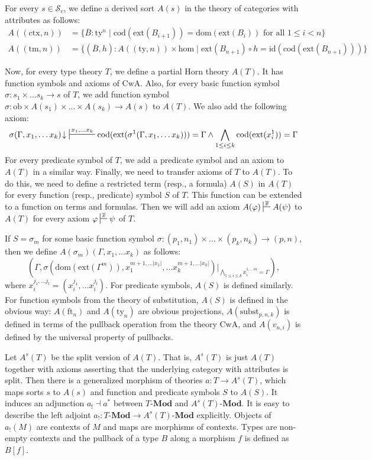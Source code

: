 \documentclass[reqno]{amsart}
\theoremstyle{definition}
\theoremstyle{remark}
\newcommand{\fs}[1]{\mathrm{#1}}
\newcommand{\Mod}[1]{#1\text{-}\mathbf{Mod}}
\numberwithin{figure}{section}
\begin{document}
For every $s \in \mathcal{S}_c$, we define a derived sort $A(s)$ in the theory of categories with attributes as follows:
\begin{align*}
A((\fs{ctx},n)) & = \{ \overline{B} : \fs{ty}^n \mid \fs{cod}(\fs{ext}(B_{i+1})) = \fs{dom}(\fs{ext}(B_i)) \text{ for all } 1 \leq i < n \} \\
A((\fs{tm},n)) & = \{ (\overline{B}, h) : A((\fs{ty},n)) \times \fs{hom} \mid \fs{ext}(B_{n+1}) \circ h = \fs{id}(\fs{cod}(\fs{ext}(B_{n+1}))) \}
\end{align*}

Now, for every type theory $T$, we define a partial Horn theory $A(T)$.
It has function symbols and axioms of $\fs{CwA}$.
Also, for every basic function symbol $\sigma : s_1 \times \ldots s_k \to s$ of $T$, we add function symbol $\sigma : \fs{ob} \times A(s_1) \times \ldots \times A(s_k) \to A(s)$ to $A(T)$.
We also add the following axiom:
\[ \sigma(\Gamma, x_1, \ldots x_k)\!\downarrow\ \sststile{}{x_1, \ldots x_k} \fs{cod}(\fs{ext}(\sigma^1(\Gamma, x_1, \ldots x_k))) = \Gamma \land \bigwedge_{1 \leq i \leq k} \fs{cod}(\fs{ext}(x_i^1)) = \Gamma \]
For every predicate symbol of $T$, we add a predicate symbol and an axiom to $A(T)$ in a similar way.
Finally, we need to transfer axioms of $T$ to $A(T)$.
To do this, we need to define a restricted term (resp., a formula) $A(S)$ in $A(T)$ for every function (resp., predicate) symbol $S$ of $T$.
This function can be extended to a function on terms and formulas.
Then we will add an axiom $A(\varphi) \sststile{}{\overline{x}} A(\psi)$ to $A(T)$ for every axiom $\varphi \sststile{}{\overline{x}} \psi$ of $T$.

If $S = \sigma_m$ for some basic function symbol $\sigma : (p_1,n_1) \times \ldots \times (p_k,n_k) \to (p,n)$, then we define $A(\sigma_m)(\Gamma, x_1, \ldots x_k)$ as follows:
\[ (\Gamma, \sigma(\fs{dom}(\fs{ext}(\Gamma^m)), x_1^{m+1, \ldots |x_1|}, \ldots x_k^{m+1, \ldots |x_k|})|_{\bigwedge_{1 \leq i \leq k} x_i^{1, \ldots m} = \Gamma}), \]
where $x_i^{j_1, \ldots j_l} = (x_i^{j_1}, \ldots x_i^{j_l})$.
For predicate symbols, $A(S)$ is defined similarly.
For function symbols from the theory of substitution, $A(S)$ is defined in the obvious way: $A(\fs{ft}_n)$ and $A(\fs{ty}_n)$ are obvious projections,
$A(\fs{subst}_{p,n,k})$ is defined in terms of the pullback operation from the theory $\fs{CwA}$, and $A(v_{n,i})$ is defined by the universal property of pullbacks.

Let $A^s(T)$ be the split version of $A(T)$.
That is, $A^s(T)$ is just $A(T)$ together with axioms asserting that the underlying category with attributes is split.
Then there is a generalized morphism of theories $a : T \to A^s(T)$, which maps sorts $s$ to $A(s)$ and function and predicate symbols $S$ to $A(S)$.
It induces an adjunction $a_! \dashv a^*$ between $\Mod{T}$ and $\Mod{A^s(T)}$.
It is easy to describe the left adjoint $a_! : \Mod{T} \to \Mod{A^s(T)}$ explicitly.
Objects of $a_!(M)$ are contexts of $M$ and maps are morphisms of contexts.
Types are non-empty contexts and the pullback of a type $B$ along a morphism $f$ is defined as $B[f]$.
\end{document}

